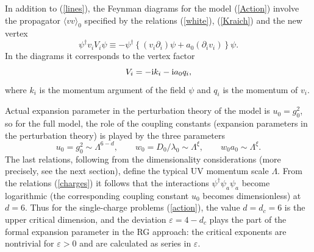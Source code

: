 \documentclass[12pt]{article}
\begin{document}
In addition to (\ref{lines}), the Feynman diagrams for the model
(\ref{Action}) involve the propagator
$\langle vv \rangle_{0}$ specified by the relations (\ref{white}),
(\ref{Kraich}) and the new vertex
\begin{equation}
\psi^{\dag} v_{i} V_{i} \psi \equiv -
\psi^{\dag}\left\{ (v_{i}\partial_{i}) \psi + a_{0}(\partial_{i}v_{i})
\right\} \psi.
\label{Vertex}
\end{equation}
In the diagrams it corresponds to the vertex factor
\begin{equation}
V_{i} = - {\rm i} k_{i} - {\rm i} a_{0} q_{i},
\label{VertexF}
\end{equation}
where $k_{i}$ is the momentum argument of the field $\psi$ and
$q_{i}$ is the momentum of $v_{i}$.

Actual expansion parameter in the perturbation theory of the model is $u_{0}=g_{0}^2$, so
for the full model, the role of the coupling constants (expansion
parameters in the perturbation theory) is played by the three parameters
\begin{equation}
u_{0}=g_{0}^2  \sim \Lambda^{6-d}, \qquad
w_{0} = D_{0}/\lambda_{0} \sim \Lambda^{\xi},
\qquad w_{0}a_{0} \sim \Lambda^{\xi}.
\label{charges}
\end{equation}
The last relations, following from the dimensionality considerations
(more precisely, see the next section), define the typical UV momentum
scale $\Lambda$. From the relations (\ref{charges}) it follows that the
interactions $\psi^{\dagger}\psi_{a}\psi_{a}$ become logarithmic (the corresponding coupling
constant $u_{0}$ becomes dimensionless) at $d=6$.
Thus for the single-charge problems (\ref{action}),
the value $d=d_{c}=6$ is
the upper critical dimension, and the deviation $\varepsilon=4-d_{c}$ plays the
part of the formal expansion parameter in the RG approach: the critical
exponents are nontrivial for $\varepsilon>0$ and are calculated as series in
$\varepsilon$.
\end{document}
